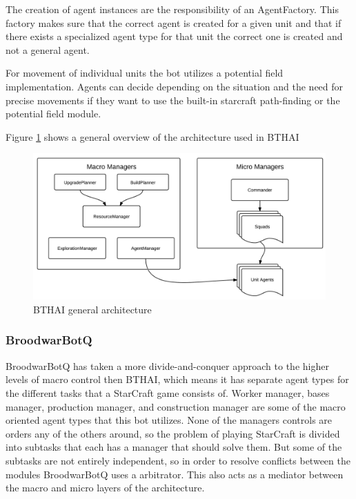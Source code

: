 The creation of agent instances are the responsibility of an AgentFactory. This factory makes sure that the correct agent is created for a given unit and that if there exists a specialized agent type for that unit the correct one is created and not a general agent. 

For movement of individual units the bot utilizes a potential field implementation. Agents can decide depending on the situation and the need for precise movements if they want to use the built-in starcraft path-finding or the potential field module. 

Figure \ref{fig:bthaiarch} shows a general overview of the architecture used in BTHAI


\begin{figure}[h!tbp]
\centering
\includegraphics[scale=0.8]{graphics/bthai.png}
\caption{BTHAI general architecture}
\label{fig:bthaiarch}
\end{figure}

\subsubsection{BroodwarBotQ}
BroodwarBotQ has taken a more divide-and-conquer approach to the higher levels
of macro control then BTHAI, which means it has separate agent types for the
different tasks that a StarCraft game consists of. Worker manager, bases
manager, production manager, and construction manager are some of the macro
oriented agent types that this bot utilizes. None of the managers controls are
orders any of the others around, so the problem of playing StarCraft is divided
into subtasks that each has a manager that should solve them. But some of the
subtasks are not entirely independent, so in order to resolve conflicts between
the modules BroodwarBotQ uses a arbitrator. This also acts as a mediator between
the macro and micro layers of the architecture.

